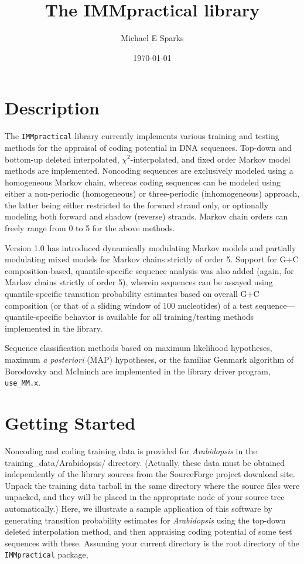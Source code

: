 \documentclass[12pt]{article}
\begin{document}

\title{The IMMpractical library}
\author{Michael E Sparks}
\date{\today}
\maketitle

\section{Description}
The \texttt{IMMpractical} library currently implements various training
and testing methods for the appraisal of coding potential in DNA
sequences.  Top-down and bottom-up deleted interpolated,
$\chi^2$-interpolated, and fixed order Markov model
methods are implemented.  Noncoding sequences are exclusively modeled
using a homogeneous Markov chain, whereas coding sequences can be modeled
using either a non-periodic (homogeneous) or three-periodic (inhomogeneous)
approach, the latter being either restricted to the forward strand only, or
optionally modeling both forward and shadow (reverse) strands.
Markov chain orders can freely range from 0 to 5 for the above methods.

Version 1.0 has introduced dynamically modulating Markov models and
partially modulating mixed models for Markov chains strictly of order 5.
Support for G+C composition-based, quantile-specific sequence analysis was
also added (again, for Markov chains strictly of order 5), wherein
sequences can be assayed using quantile-specific transition probability
estimates based on overall G+C composition (or that of a
sliding window of 100 nucleotides) of a test sequence---quantile-specific
behavior is available for all training/testing methods implemented
in the library.

Sequence classification methods based on maximum likelihood hypotheses,
maximum \textit{a posteriori} (MAP) hypotheses, or the
familiar Genmark algorithm of Borodovsky and McIninch are implemented
in the library driver program, \texttt{use\_MM.x}.

\section{Getting Started}
Noncoding and coding training data is provided for \emph{Arabidopsis}
in the training\_data/Arabidopsis/ directory. (Actually, these data must
be obtained independently of the library sources from the SourceForge
project download site. Unpack the training data tarball in the same
directory where the source files were unpacked, and they will be placed in the
appropriate node of your source tree automatically.)  Here, we illustrate
a sample application of this software by generating transition probability
estimates for \emph{Arabidopsis} using the top-down deleted interpolation
method, and then appraising coding potential of some test sequences with
these.  Assuming your current directory is the
root directory of the \texttt{IMMpractical} package,
\end{document}
